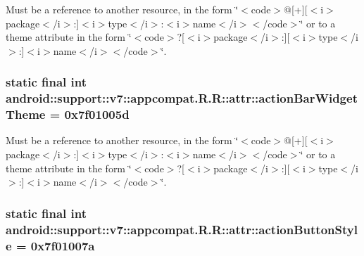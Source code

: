 Must be a reference to another resource, in the form \char`\"{}$<$code$>$@\mbox{[}+\mbox{]}\mbox{[}$<$i$>$package$<$/i$>$:\mbox{]}$<$i$>$type$<$/i$>$:$<$i$>$name$<$/i$>$$<$/code$>$\char`\"{} or to a theme attribute in the form \char`\"{}$<$code$>$?\mbox{[}$<$i$>$package$<$/i$>$:\mbox{]}\mbox{[}$<$i$>$type$<$/i$>$:\mbox{]}$<$i$>$name$<$/i$>$$<$/code$>$\char`\"{}. \hypertarget{classandroid_1_1support_1_1v7_1_1appcompat_1_1_r_1_1attr_2bac7866f17748b256e90db44b8db878}{
\subsubsection[{actionBarWidgetTheme}]{\setlength{\rightskip}{0pt plus 5cm}static final int android::support::v7::appcompat.R.R::attr::actionBarWidgetTheme = 0x7f01005d}}
\label{classandroid_1_1support_1_1v7_1_1appcompat_1_1_r_1_1attr_2bac7866f17748b256e90db44b8db878}


Must be a reference to another resource, in the form \char`\"{}$<$code$>$@\mbox{[}+\mbox{]}\mbox{[}$<$i$>$package$<$/i$>$:\mbox{]}$<$i$>$type$<$/i$>$:$<$i$>$name$<$/i$>$$<$/code$>$\char`\"{} or to a theme attribute in the form \char`\"{}$<$code$>$?\mbox{[}$<$i$>$package$<$/i$>$:\mbox{]}\mbox{[}$<$i$>$type$<$/i$>$:\mbox{]}$<$i$>$name$<$/i$>$$<$/code$>$\char`\"{}. \hypertarget{classandroid_1_1support_1_1v7_1_1appcompat_1_1_r_1_1attr_2612afb8ce3c1b9b6d53e3a6d16b83fb}{
\subsubsection[{actionButtonStyle}]{\setlength{\rightskip}{0pt plus 5cm}static final int android::support::v7::appcompat.R.R::attr::actionButtonStyle = 0x7f01007a}}
\label{classandroid_1_1support_1_1v7_1_1appcompat_1_1_r_1_1attr_2612afb8ce3c1b9b6d53e3a6d16b83fb}



